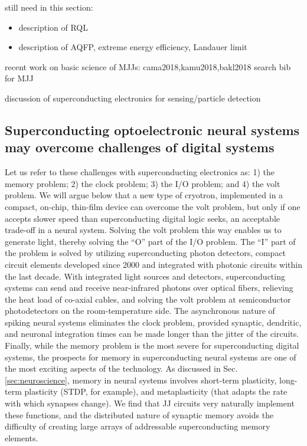 \documentclass[twocolumn]{article}
\begin{document}
\vspace{3em}
still need in this section:
\begin{itemize}
\item description of RQL
\item description of AQFP, extreme energy efficiency, Landauer limit
\end{itemize}

\vspace{3em}
recent work on basic science of MJJs: cama2018,kamu2018,bakl2018
search bib for MJJ

\vspace{3em} 
discussion of superconducting electronics for sensing/particle detection

\subsection{Superconducting optoelectronic neural systems may overcome challenges of digital systems}
Let us refer to these challenges with superconducting electronics as: 1) the memory problem; 2) the clock problem; 3) the I/O problem; and 4) the volt problem. We will argue below that a new type of cryotron, implemented in a compact, on-chip, thin-film device can overcome the volt problem, but only if one accepts slower speed than superconducting digital logic seeks, an acceptable trade-off in a neural system. Solving the volt problem this way enables us to generate light, thereby solving the ``O'' part of the I/O problem. The ``I'' part of the problem is solved by utilizing superconducting photon detectors, compact circuit elements developed since 2000 and integrated with photonic circuits within the last decade. With integrated light sources and detectors, superconducting systems can send and receive near-infrared photons over optical fibers, relieving the heat load of co-axial cables, and solving the volt problem at semiconductor photodetectors on the room-temperature side. The asynchronous nature of spiking neural systems eliminates the clock problem, provided synaptic, dendritic, and neuronal integration times can be made longer than the jitter of the circuits. Finally, while the memory problem is the most severe for superconducting digital systems, the prospects for memory in superconducting neural systems are one of the most exciting aspects of the technology. As discussed in Sec.\,\ref{sec:neuroscience}, memory in neural systems involves short-term plasticity, long-term plasticity (STDP, for example), and metaplasticity (that adapts the rate with which synapses change). We find that JJ circuits very naturally implement these functions, and the distributed nature of synaptic memory avoids the difficulty of creating large arrays of addressable superconducting memory elements. 
\end{document}
